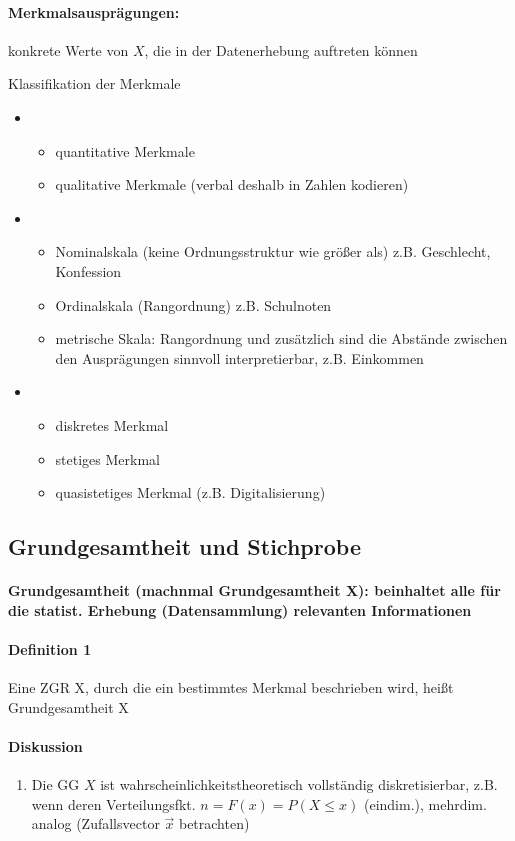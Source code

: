 \documentclass[a4paper]{scrartcl}
\begin{document}
\paragraph{Merkmalsausprägungen:} konkrete Werte von $X$, die in der Datenerhebung auftreten können

Klassifikation der Merkmale
\begin{itemize}
\item \begin{itemize}
\item quantitative Merkmale
\item qualitative Merkmale (verbal deshalb in Zahlen kodieren)
\end{itemize}
\item \begin{itemize}
\item Nominalskala (keine Ordnungsstruktur wie größer als) z.B. Geschlecht, Konfession
\item Ordinalskala (Rangordnung) z.B. Schulnoten
\item metrische Skala: Rangordnung und zusätzlich sind die Abstände zwischen den Ausprägungen sinnvoll interpretierbar, z.B. Einkommen
\end{itemize}
\item \begin{itemize}
\item diskretes Merkmal
\item stetiges Merkmal
\item quasistetiges Merkmal (z.B. Digitalisierung)
\end{itemize}
\end{itemize}


\subsection{Grundgesamtheit und Stichprobe}
\paragraph{Grundgesamtheit (machnmal Grundgesamtheit X): beinhaltet alle für die statist. Erhebung (Datensammlung) relevanten Informationen}

\paragraph{Definition 1} Eine ZGR X, durch die ein bestimmtes Merkmal beschrieben wird, heißt Grundgesamtheit X

\paragraph{Diskussion} 
\begin{enumerate}
\item Die GG $X$ ist wahrscheinlichkeitstheoretisch vollständig diskretisierbar, z.B. wenn deren Verteilungsfkt. $n = F(x) = P(X \leq x)$ (eindim.), mehrdim. analog (Zufallsvector $\vec{x}$ betrachten)
\end{enumerate}
\end{document}
